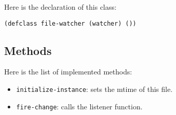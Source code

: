 \documentclass[a4paper]{report}
\newcommand{\code}{\texttt}
\begin{document}
Here is the declaration of this class:

\begin{verbatim}
(defclass file-watcher (watcher) ())
\end{verbatim}

\subsection{Methods}

Here is the list of implemented methods:

\begin{itemize}
    \item \code{initialize-instance}: sets the mtime of this file.
    \item \code{fire-change}: calls the listener function.
\end{itemize}
\end{document}
